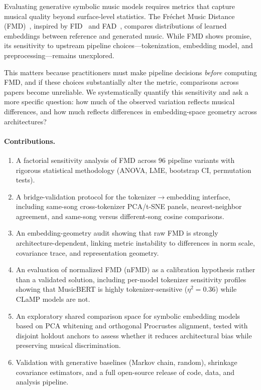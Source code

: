 \documentclass[a4paper]{article}
\begin{document}
Evaluating generative symbolic music models requires metrics that capture musical quality beyond surface-level statistics. The Fréchet Music Distance (FMD)~\citep{retkowski2025fmd}, inspired by FID~\citep{heusel2017gans} and FAD~\citep{kilgour2018fad}, compares distributions of learned embeddings between reference and generated music. While FMD shows promise, its sensitivity to upstream pipeline choices---tokenization, embedding model, and preprocessing---remains unexplored.

This matters because practitioners must make pipeline decisions \emph{before} computing FMD, and if these choices substantially alter the metric, comparisons across papers become unreliable. We systematically quantify this sensitivity and ask a more specific question: how much of the observed variation reflects musical differences, and how much reflects differences in embedding-space geometry across architectures?

\paragraph{Contributions.}
\begin{enumerate}
    \item A factorial sensitivity analysis of FMD across 96 pipeline variants with rigorous statistical methodology (ANOVA, LME, bootstrap CI, permutation tests).
    \item A bridge-validation protocol for the tokenizer$\rightarrow$embedding interface, including same-song cross-tokenizer PCA/t-SNE panels, nearest-neighbor agreement, and same-song versus different-song cosine comparisons.
    \item An embedding-geometry audit showing that raw FMD is strongly architecture-dependent, linking metric instability to differences in norm scale, covariance trace, and representation geometry.
    \item An evaluation of normalized FMD (nFMD) as a calibration hypothesis rather than a validated solution, including per-model tokenizer sensitivity profiles showing that MusicBERT is highly tokenizer-sensitive ($\eta^2 = 0.36$) while CLaMP models are not.
    \item An exploratory shared comparison space for symbolic embedding models based on PCA whitening and orthogonal Procrustes alignment, tested with disjoint holdout anchors to assess whether it reduces architectural bias while preserving musical discrimination.
    \item Validation with generative baselines (Markov chain, random), shrinkage covariance estimators, and a full open-source release of code, data, and analysis pipeline.
\end{enumerate}
\end{document}
